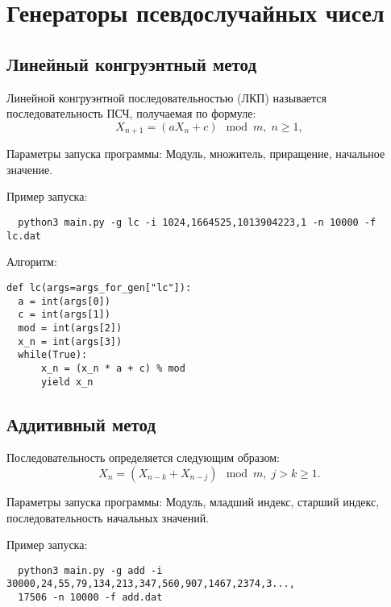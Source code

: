 \documentclass[spec, och, labwork]{shiza}
\begin{document}
\tableofcontents

\section{Генераторы псевдослучайных чисел}
\subsection{Линейный конгруэнтный метод}
Линейной конгруэнтной последовательностью (ЛКП) называется последовательность ПСЧ, получаемая по формуле:
\begin{equation}
  X_{n + 1} = (aX_n + c) \mod m, \; n \geq 1,
\end{equation}

Параметры запуска программы:
Модуль, множитель, приращение, начальное значение.

Пример запуска:
\begin{small}
\begin{verbatim}
  python3 main.py -g lc -i 1024,1664525,1013904223,1 -n 10000 -f lc.dat
\end{verbatim}
\end{small}

Алгоритм:
\begin{small}
\begin{verbatim}
def lc(args=args_for_gen["lc"]):
  a = int(args[0])
  c = int(args[1])
  mod = int(args[2])
  x_n = int(args[3]) 
  while(True):
      x_n = (x_n * a + c) % mod
      yield x_n
\end{verbatim}
\end{small}



\subsection{Аддитивный метод}

Последовательность определяется следующим образом:
\begin{equation}
  X_n = (X_{n - k} + X_{n - j}) \mod m, \; j > k \geq 1.
\end{equation}

Параметры запуска программы: Модуль, младший индекс, старший индекс, последовательность начальных
значений.

Пример запуска:
\begin{small}
\begin{verbatim}
  python3 main.py -g add -i 30000,24,55,79,134,213,347,560,907,1467,2374,3...,
  17506 -n 10000 -f add.dat
\end{verbatim}
\end{small}
\end{document}
